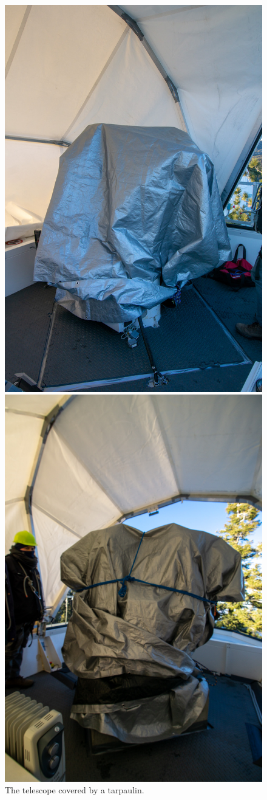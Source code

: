 \begin{enumerate}
\begin{figure}
\ifcoatlioan
\begin{center}
\includegraphics[width=0.65\linewidth]{figures/tarpaulin-coatlioan.jpg}
\end{center}
\caption{The telescope covered by a tarpaulin.}
\fi
\ifddotioan
\begin{center}
\includegraphics[width=0.45\linewidth]{figures/tarpaulin-ddotioan.jpg}

\end{center}
\end{figure}
\end{enumerate}
